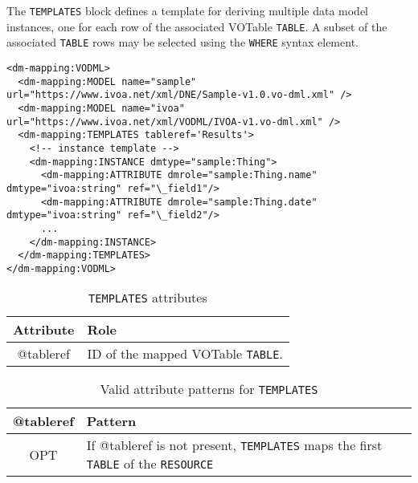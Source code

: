The \texttt{TEMPLATES} block defines a template for deriving multiple data model instances,
one for each row of the associated VOTable \texttt{TABLE}.  A subset of the associated
\texttt{TABLE} rows may be selected using the \texttt{WHERE} syntax element.

\begin{lstlisting}[frame=single,caption={Example \texttt{TEMPLATES} block},style=XML,basicstyle=\tiny]
<dm-mapping:VODML>
  <dm-mapping:MODEL name="sample" url="https://www.ivoa.net/xml/DNE/Sample-v1.0.vo-dml.xml" />
  <dm-mapping:MODEL name="ivoa"   url="https://www.ivoa.net/xml/VODML/IVOA-v1.vo-dml.xml" />
  <dm-mapping:TEMPLATES tableref='Results'>
    <!-- instance template -->
    <dm-mapping:INSTANCE dmtype="sample:Thing">
      <dm-mapping:ATTRIBUTE dmrole="sample:Thing.name" dmtype="ivoa:string" ref="\_field1"/>
      <dm-mapping:ATTRIBUTE dmrole="sample:Thing.date" dmtype="ivoa:string" ref="\_field2"/>
      ...
    </dm-mapping:INSTANCE>
  </dm-mapping:TEMPLATES>
</dm-mapping:VODML>
\end{lstlisting}

\begin{table}[!htbp]
  \small
  \centering
  \begin{tabulary}{\linewidth}{|c|J|}
    \hline 
         \textbf{Attribute} & 
         \textbf {Role}\\
    \hline
    \hline  
         @tableref & 
         ID of the mapped VOTable \texttt{TABLE}.\\
    \hline 
  \end{tabulary}
  \caption{\texttt{TEMPLATES} attributes} 
  \label{tbl:templates-att}
\end{table}

\begin{table}[!htbp]
  \small
  \centering
  \begin{tabulary}{\linewidth}{|c|J|}
    \hline 
        \textbf{@tableref} &
        \textbf{Pattern}\\
    \hline
    \hline  
        OPT &           
        If @tableref is not present, \texttt{TEMPLATES} maps the first \texttt{TABLE} of the \texttt{RESOURCE}\\
    \hline 
  \end{tabulary}
  \caption{Valid attribute patterns for  \texttt{TEMPLATES}} 
  \label{tbl:templates-pattern}
 \end{table}


